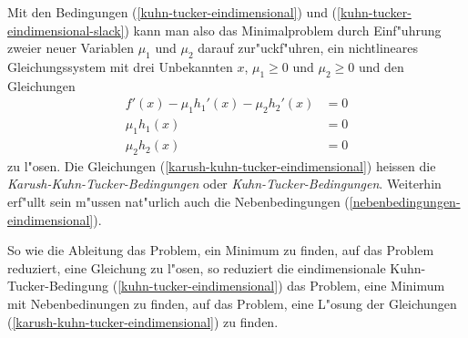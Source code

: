 Mit den Bedingungen (\ref{kuhn-tucker-eindimensional}) und
(\ref{kuhn-tucker-eindimensional-slack})
kann man also das Minimalproblem
durch Einf"uhrung zweier neuer Variablen $\mu_1$ und $\mu_2$
darauf zur"uckf"uhren, ein nichtlineares Gleichungssystem mit
drei Unbekannten $x$, $\mu_1\ge 0$ und $\mu_2\ge0$ und den
Gleichungen
\begin{equation}
\begin{aligned}
f'(x)-\mu_1h_1'(x)-\mu_2h_2'(x)&=0\\
\mu_1h_1(x)&= 0\\
\mu_2h_2(x)&= 0
\end{aligned}
\label{karush-kuhn-tucker-eindimensional}
\end{equation}
zu l"osen.
Die Gleichungen (\ref{karush-kuhn-tucker-eindimensional}) heissen
die {\em Karush-Kuhn-Tucker-Bedingungen} oder {\em Kuhn-Tucker-Bedingungen}.
Weiterhin erf"ullt sein m"ussen nat"urlich auch die
Nebenbedingungen (\ref{nebenbedingungen-eindimensional}).

So wie die Ableitung das Problem, ein Minimum zu finden, auf das
Problem reduziert, eine Gleichung zu l"osen, so reduziert die
eindimensionale Kuhn-Tucker-Bedingung (\ref{kuhn-tucker-eindimensional})
das Problem, eine Minimum
mit Nebenbedinungen zu finden, auf das Problem, eine L"osung der
Gleichungen (\ref{karush-kuhn-tucker-eindimensional}) zu finden.

